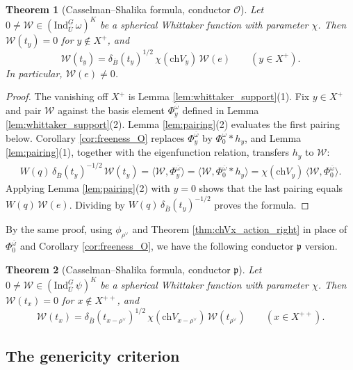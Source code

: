 \documentclass[12pt]{article}
\numberwithin{equation}{section}
\newtheorem{theorem}{Theorem}[section]
\theoremstyle{definition}
\theoremstyle{remark}
\theoremstyle{plain}
\begin{document}
\begin{theorem}[Casselman--Shalika formula, conductor $\mathcal{O}$]\label{thm:CS_O}
Let $0 \neq \mathcal{W} \in (\mathrm{Ind}_{\overline{U}}^G\, \omega)^K$ be a spherical Whittaker function with parameter $\chi$. Then $\mathcal{W}(t_y) = 0$ for $y \notin X^+$, and
\[
\mathcal{W}(t_y) = \delta_{\overline{B}}(t_y)^{1/2}\, \chi(\mathrm{ch}V_y)\, \mathcal{W}(e) \qquad (y \in X^+).
\]
In particular, $\mathcal{W}(e) \neq 0$.
\end{theorem}
\begin{proof}
The vanishing off $X^+$ is Lemma \ref{lem:whittaker_support}(1). Fix $y \in X^+$ and pair $\mathcal{W}$ against the basis element $\Phi^{\overline\omega}_y$ defined in Lemma \ref{lem:whittaker_support}(2). Lemma \ref{lem:pairing}(2) evaluates the first pairing below. Corollary \ref{cor:freeness_O} replaces $\Phi^{\overline\omega}_y$ by $\Phi^{\overline\omega}_0*h_y$, and Lemma \ref{lem:pairing}(1), together with the eigenfunction relation, transfers $h_y$ to $\mathcal W$:
\begin{align*}
W(q)\,\delta_{\overline{B}}(t_y)^{-1/2}\, \mathcal{W}(t_y) = \big\langle \mathcal{W}, \Phi^{\overline{\omega}}_y \big\rangle
= \big\langle \mathcal{W}, \Phi^{\overline{\omega}}_0 * h_y \big\rangle
= \chi(\mathrm{ch}V_y)\, \big\langle \mathcal{W}, \Phi^{\overline{\omega}}_0 \big\rangle.
\end{align*}
Applying Lemma \ref{lem:pairing}(2) with $y = 0$ shows that the last pairing equals $W(q)\, \mathcal{W}(e)$. Dividing by $W(q)\,\delta_{\overline{B}}(t_y)^{-1/2}$ proves the formula.
\end{proof}

By the same proof, using $\phi_{\rho^\vee}$ and Theorem \ref{thm:chVx_action_right} in place of $\Phi^{\overline{\omega}}_0$ and Corollary \ref{cor:freeness_O}, we have the following conductor $\mathfrak p$ version.

\begin{theorem}[Casselman--Shalika formula, conductor $\mathfrak{p}$]\label{thm:CS_p}
Let $0 \neq \mathcal{W} \in (\mathrm{Ind}_{\overline{U}}^G\, \psi)^K$ be a spherical Whittaker function with parameter $\chi$. Then $\mathcal{W}(t_x) = 0$ for $x \notin X^{++}$, and
\[
\mathcal{W}(t_x) = \delta_{\overline{B}}(t_{x-\rho^\vee})^{1/2}\, \chi(\mathrm{ch}V_{x-\rho^\vee})\, \mathcal{W}(t_{\rho^\vee}) \qquad (x \in X^{++}).
\]
\end{theorem}

\subsection{The genericity criterion}
\end{document}
